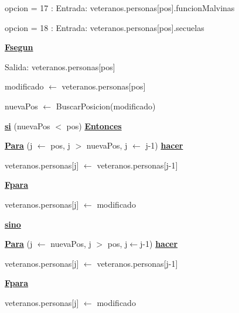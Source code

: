 \documentclass{article}
\begin{document}
                    \hspace{20mm}opcion = 17 : Entrada: veteranos.personas[pos].funcionMalvinas

                    \hspace{20mm}opcion = 18 : Entrada: veteranos.personas[pos].secuelas

                \hspace{16mm}\underline{\textbf{Fsegun}}
                
                \hspace{16mm}Salida: veteranos.personas[pos]

                \hspace{16mm}modificado $\leftarrow$ veteranos.personas[pos]

                \hspace{16mm}nuevaPos $\leftarrow$ BuscarPosicion(modificado)

                \hspace{16mm}\underline{\textbf{si}} (nuevaPos $<$ pos) \underline{\textbf{Entonces}}

                    \hspace{20mm}\underline{\textbf{Para}} (j $\leftarrow$ pos, j $>$ nuevaPos, j $\leftarrow$ j-1) \underline{\textbf{hacer}}

                        \hspace{24mm}veteranos.personas[j] $\leftarrow$ veteranos.personas[j-1]
                    
                    \hspace{20mm}\underline{\textbf{Fpara}}

                    \hspace{20mm}veteranos.personas[j] $\leftarrow$ modificado

                \hspace{16mm}\underline{\textbf{sino}}

                    \hspace{20mm}\underline{\textbf{Para}} (j $\leftarrow$ nuevaPos, j $>$ pos, j$\leftarrow$j-1) \underline{\textbf{hacer}}

                        \hspace{24mm}veteranos.personas[j] $\leftarrow$ veteranos.personas[j-1]

                    \hspace{20mm}\underline{\textbf{Fpara}}
                    
                    \hspace{20mm}veteranos.personas[j] $\leftarrow$ modificado
\end{document}
